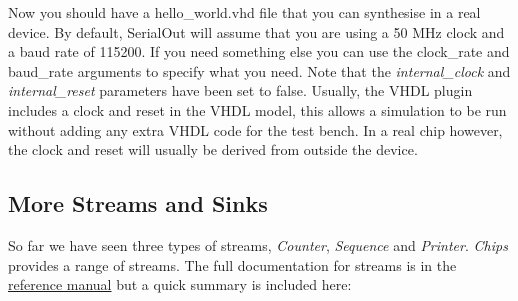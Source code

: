 \documentclass[letterpaper,10pt,english]{sphinxmanual}
\begin{document}
Now you should have a hello\_world.vhd file that you can synthesise in a real
device. By default, SerialOut will assume that you are using a 50 MHz clock and
a baud rate of 115200. If you need something else you can use the clock\_rate
and baud\_rate arguments to specify what you need. Note that the
\emph{internal\_clock} and \emph{internal\_reset} parameters have been set to false.
Usually, the VHDL plugin includes a clock and reset in the VHDL model, this
allows a simulation to be run without adding any extra VHDL code for the test
bench. In a real chip however, the clock and reset will usually be derived from
outside the device.


\subsection{More Streams and Sinks}
\label{tutorial/index:more-streams-and-sinks}
So far we have seen three types of streams, \emph{Counter}, \emph{Sequence} and
\emph{Printer}. \emph{Chips} provides a range of streams. The full documentation for
streams is in the \href{http://dawsonjon.github.com/chips/language\_reference/}{reference manual} but a quick summary is included here:
\end{document}
